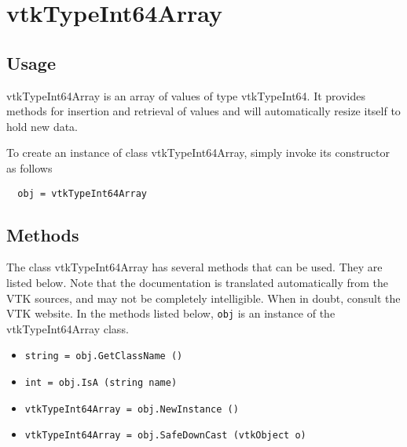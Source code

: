 \section{vtkTypeInt64Array}

\subsection{Usage}

 vtkTypeInt64Array is an array of values of type vtkTypeInt64.  It
 provides methods for insertion and retrieval of values and will
 automatically resize itself to hold new data.

To create an instance of class vtkTypeInt64Array, simply
invoke its constructor as follows
\begin{verbatim}
  obj = vtkTypeInt64Array
\end{verbatim}
\subsection{Methods}

The class vtkTypeInt64Array has several methods that can be used.
  They are listed below.
Note that the documentation is translated automatically from the VTK sources,
and may not be completely intelligible.  When in doubt, consult the VTK website.
In the methods listed below, \verb|obj| is an instance of the vtkTypeInt64Array class.
\begin{itemize}
\item  \verb|string = obj.GetClassName ()|

\item  \verb|int = obj.IsA (string name)|

\item  \verb|vtkTypeInt64Array = obj.NewInstance ()|

\item  \verb|vtkTypeInt64Array = obj.SafeDownCast (vtkObject o)|

\end{itemize}
